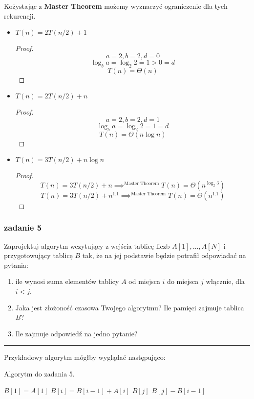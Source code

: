 \documentclass[11pt,a4paper]{article}
\begin{document}
Kożystając z \textbf{Master Theorem} możemy wyznaczyć ograniczenie dla tych rekurencji.
\begin{itemize}
    \item $T(n) = 2T(n/2) + 1$
        \begin{proof}
            \[
                a = 2, b = 2, d = 0
            \]
            \[
                \log_b a = \log_2 2 = 1 > 0 = d
            \]
            \[
                T(n) = \Theta(n)
            \]
        \end{proof}
    \item $T(n) = 2T(n/2) + n$
        \begin{proof}
            \[
                a = 2, b = 2, d = 1
            \]
            \[
                \log_b a = \log_2 2 = 1 = d
            \]
            \[
                T(n) = \Theta(n \log n)
            \]
        \end{proof}
    \item $T(n) = 3T(n/2) + n \log n$
        \begin{proof}
            \[
                T(n) = 3T(n/2) + n \implies^{\text{Master Theorem}} T(n) = \Theta(n^{\log_2 3})
            \]
            \[
                T(n) = 3T(n/2) + n^{1.1} \implies^{\text{Master Theorem}} T(n) = \Theta(n^{1.1})
            \]
        \end{proof}
\end{itemize}

\subsubsection{zadanie 5}
Zaprojektuj algorytm wczytujący z wejścia tablicę liczb $A[1], \ldots, A[N]$ i przygotowujący tablicę $B$ tak, że na jej podstawie będzie potrafił odpowiadać na pytania:
\begin{enumerate}
    \item ile wynosi suma elementów tablicy $A$ od miejsca $i$ do miejsca $j$ włącznie, dla $i < j$.
    \item Jaka jest złożoność czasowa Twojego algorytmu? Ile pamięci zajmuje tablica $B$?
    \item Ile zajmuje odpowiedź na jedno pytanie?
\end{enumerate}

\bigskip
\hrule
\bigskip

Przykładowy algorytm mógłby wyglądać następująco:
\begin{algorithm}
    \caption{Algorytm do zadania 5.}
    \begin{algorithmic}[1]
        \State $B[1] = A[1]$
            \State $B[i] = B[i-1] + A[i]$
        \EndFor
            \State \Return $B[j]$
        \Else
            \State \Return $B[j] - B[i-1]$
        \EndIf
        \EndProcedure
    \end{algorithmic}
\end{algorithm}
\end{document}
